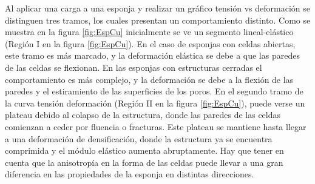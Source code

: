 \documentclass[a4paper,12pt,fleqn,twoside,openany]{book}
\begin{document}
Al aplicar una carga a una esponja y realizar un gráfico tensión vs deformación se distinguen tres tramos, los cuales presentan un comportamiento 
distinto. Como se muestra en la figura \ref{fig:EspCu} inicialmente se ve un segmento lineal-elástico (Región I en la figura \ref{fig:EspCu}). En el caso de esponjas con celdas abiertas, este tramo 
es más marcado, y la deformación elástica se debe a que las paredes de las celdas se flexionan. En las esponjas con estructuras cerradas el 
comportamiento es más complejo, y la deformación se debe a la flexión de las paredes y el estiramiento de las superficies de los poros. 
En el segundo tramo de la curva tensión deformación (Región II en la figura \ref{fig:EspCu}), puede verse un plateau debido al colapso de la estructura, donde las paredes de las celdas 
comienzan a ceder por fluencia o fracturas. Este plateau se mantiene hasta llegar a una deformación de densificación, donde la estructura ya se encuentra 
comprimida y el módulo elástico aumenta abruptamente. Hay que tener en cuenta que la anisotropía en la forma de las celdas puede llevar a una gran diferencia 
en las propiedades de la esponja en distintas direcciones.
\end{document}
